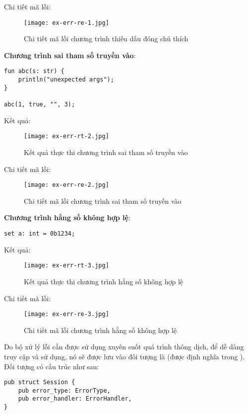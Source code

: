 \noindent Chi tiết mã lỗi:
\begin{figure}[H]
    \centering
    \texttt{[image: ex-err-re-1.jpg]}
    \caption{Chi tiết mã lỗi chương trình thiếu dấu đóng chú thích}
\end{figure}

\noindent \textbf{Chương trình sai tham số truyền vào}:

\begin{lstlisting}[]
fun abc(s: str) {
    println("unexpected args");
}

abc(1, true, "", 3);
\end{lstlisting}

\noindent Kết quả:
\begin{figure}[H]
    \centering
    \texttt{[image: ex-err-rt-2.jpg]}
    \caption{Kết quả thực thi chương trình sai tham số truyền vào}
\end{figure}

\noindent Chi tiết mã lỗi:
\begin{figure}[H]
    \centering
    \texttt{[image: ex-err-re-2.jpg]}
    \caption{Chi tiết mã lỗi chương trình sai tham số truyền vào}
\end{figure}

\noindent \textbf{Chương trình hằng số không hợp lệ}:

\begin{lstlisting}[]
set a: int = 0b1234;
\end{lstlisting}

\noindent Kết quả:
\begin{figure}[H]
    \centering
    \texttt{[image: ex-err-rt-3.jpg]}
    \caption{Kết quả thực thi chương trình hằng số không hợp lệ}
\end{figure}

\noindent Chi tiết mã lỗi:
\begin{figure}[H]
    \centering
    \texttt{[image: ex-err-re-3.jpg]}
    \caption{Chi tiết mã lỗi chương trình hằng số không hợp lệ}
\end{figure}

    Do bộ xử lý lỗi cần được sử dụng xuyên suốt quá trình thông dịch, để dễ dàng truy cập và sử dụng, nó sẽ được lưu vào đối tượng là  (được định nghĩa trong ). Đối tượng  có cấu trúc như sau:

\begin{lstlisting}[]
pub struct Session {
    pub error_type: ErrorType,
    pub error_handler: ErrorHandler,
}
\end{lstlisting}

